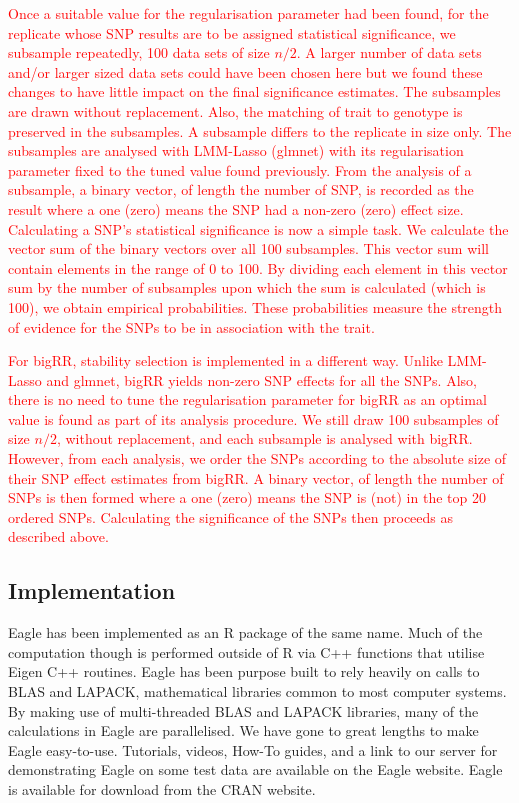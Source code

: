 \documentclass{article}
\begin{document}
 \textcolor{red}{
 Once a suitable value for the regularisation parameter had been found, for the replicate  whose 
 SNP results are to be assigned statistical significance, we subsample repeatedly, 100 data sets of size $n/2$. A larger number of 
 data sets  and/or larger sized data sets could have been chosen here but we found these changes to have 
 little impact on the final significance estimates. The subsamples are drawn without replacement. Also, 
 the matching of trait to genotype is preserved in the subsamples. A subsample differs to the replicate in size only. 
 The subsamples are analysed with LMM-Lasso (glmnet) with its regularisation parameter fixed to the tuned value found previously. 
From the analysis of a subsample, a binary vector, of length the number of SNP, is recorded as the result where a one (zero) means the SNP had a non-zero (zero) effect size. 
Calculating a SNP's statistical significance is now a simple task. We calculate the vector sum of the binary vectors over all 100 subsamples. 
This vector sum will contain elements in the range of 0 to 100. By dividing each element in this vector sum by the number of 
subsamples upon which the sum is calculated (which is 100), we obtain empirical probabilities.  
 These 
probabilities measure the strength of evidence for the SNPs to be in association with the trait. 
}

\textcolor{red}{
For bigRR, stability selection is implemented in a different way. Unlike LMM-Lasso and glmnet, bigRR yields non-zero SNP effects 
for all the SNPs. Also, there is no need to tune the regularisation parameter for bigRR as an optimal value is found as part of its analysis 
procedure. We still draw 100 subsamples of size $n/2$, without replacement, and each subsample is analysed with bigRR. 
However, from each analysis, we order the SNPs according to the absolute size of their SNP effect estimates from bigRR. 
 A binary vector, of length the number of SNPs is then formed 
where a one (zero) means the SNP is (not) in the top 20 ordered SNPs.  Calculating the significance of the SNPs then proceeds as described 
above. 
}
 



\subsection{Implementation}

Eagle has been implemented as an R package of the same name. Much of the computation though is performed outside of R 
via C++ functions that utilise Eigen C++ routines. Eagle has been purpose built to rely heavily on calls to BLAS and LAPACK, 
mathematical libraries common to most computer systems. By making use of multi-threaded  BLAS and LAPACK libraries, many of the 
calculations in Eagle are parallelised. We have gone to great lengths to make Eagle easy-to-use. Tutorials, videos, How-To guides, and 
a link to our server for demonstrating Eagle on some test data are available on the Eagle website. Eagle is available for download from the CRAN website. 
\end{document}
